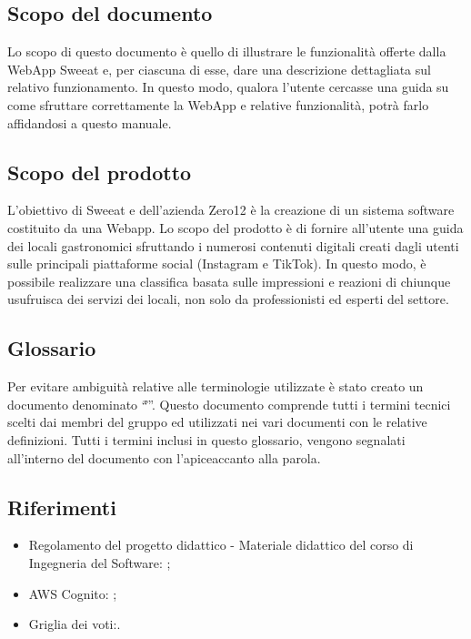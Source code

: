 
\subsection{Scopo del documento}

Lo scopo di questo documento è quello di illustrare le funzionalità offerte dalla WebApp Sweeat e, per ciascuna di esse, dare una descrizione dettagliata sul relativo funzionamento.
In questo modo, qualora l’utente cercasse una guida su come sfruttare correttamente la WebApp e relative funzionalità, potrà farlo affidandosi a questo manuale. 

\subsection{Scopo del prodotto}

L’obiettivo di Sweeat e dell’azienda Zero12 è la creazione di un sistema software costituito da una Webapp. Lo scopo del prodotto è di fornire all’utente una guida dei locali gastronomici sfruttando i numerosi contenuti digitali creati dagli utenti sulle principali piattaforme social (Instagram e TikTok). In questo modo, è possibile realizzare una classifica basata sulle impressioni e reazioni di chiunque usufruisca dei servizi dei locali, non solo da professionisti ed esperti del settore.

\subsection{Glossario}

Per evitare ambiguità relative alle terminologie utilizzate è stato creato un documento denominato “\textit{\G}”. Questo documento comprende tutti i termini tecnici scelti dai membri del gruppo ed utilizzati nei vari documenti con le relative definizioni. Tutti i termini inclusi in questo glossario, vengono segnalati all’interno del documento con l’apice\glo accanto alla parola. 

\subsection{Riferimenti}
\begin{itemize}
    \item Regolamento del progetto didattico - Materiale didattico del corso di Ingegneria del Software: \newline{};
    \item AWS Cognito: \newline {};
    \item Griglia dei voti:\newline {}.
\end{itemize}